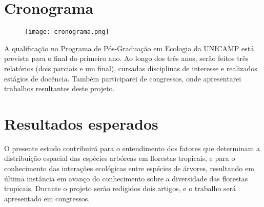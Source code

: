 \documentclass[twoside,12pt,a4paper]{report}
\begin{document}
\section{Cronograma}

	\begin{figure}[ht]
		\centering \texttt{[image: cronograma.png]}
    \end{figure}

A qualificação no Programa de Pós-Graduação em Ecologia da UNICAMP está prevista para o final do
primeiro ano. Ao longo dos três anos, serão feitos três relatórios (dois parciais e um final),
cursadas disciplinas de interesse e realizados estágios de docência. Também participarei de
congressos, onde apresentarei trabalhos resultantes deste projeto.

\section{Resultados esperados}
O presente estudo contribuirá para o entendimento dos fatores que determinam a distribuição espacial
das espécies arbóreas em florestas tropicais, e para o conhecimento das interações ecológicas entre
espécies de árvores, resultando em última instância em avanço do conhecimento sobre a diversidade
das florestas tropicais. Durante o projeto serão redigidos dois artigos, e o trabalho será apresentado
em congressos.



    
    
\end{document}
